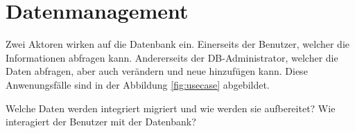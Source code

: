 \section{Datenmanagement}
Zwei Aktoren wirken auf die Datenbank ein. Einerseits der Benutzer, welcher die
Informationen abfragen kann. Andererseits der DB-Administrator, welcher die
Daten abfragen, aber auch verändern und neue hinzufügen kann. Diese
Anwenungsfälle sind in der Abbildung \ref{fig:usecase} abgebildet.


Welche Daten werden integriert migriert
 und wie werden sie 
aufbereitet?
Wie interagiert der Benutzer mit der Datenbank?